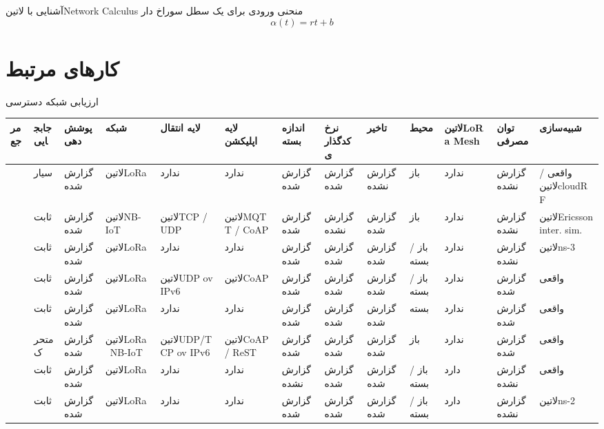 \documentclass[dvipsnames]{beamer}
\begin{document}
\begin{persian}
	\begin{frame}{آشنایی با ‌لاتین{Network Calculus}}
			 منحنی ورودی برای یک سطل سوراخ دار
			\[ \alpha(t) = rt + b \]
	\end{frame}

	\section{کارهای مرتبط}

	\begin{frame}{ارزیابی شبکه دسترسی}
		\fontsize{5pt}{6pt}\selectfont
		\begin{tabularx}{\textwidth}{|*{13}{X|}}
			\toprule
			مرجع &
			جابجایی &
			پوشش‌دهی &
			شبکه &
			لایه انتقال &
			لایه اپلیکشن &
			اندازه بسته &
			نرخ کدگذاری &
			تاخیر &
			محیط &
			‌لاتین{LoRa Mesh} &
			توان مصرفی &
			شبیه‌سازی \\
			\midrule
			\cite{sensors-18-00772-v3} &
			سیار &
			گزارش شده &
			‌لاتین{LoRa} &
			ندارد &
			ندارد &
			گزارش شده &
			گزارش شده &
			گزارش نشده &
			باز &
			ندارد &
			گزارش نشده &
			واقعی / ‌لاتین{cloudRF} \\
			\midrule
			\cite{sensors-19-00007} &
			ثابت &
			گزارش شده &
			‌لاتین{NB-IoT} &
			‌لاتین{TCP / UDP} &
			‌لاتین{MQTT / CoAP} &
			گزارش شده &
			گزارش نشده &
			گزارش شده &
			باز &
			ندارد &
			گزارش نشده &
			‌لاتین{Ericsson inter. sim.} \\
			\midrule
			\cite{sensors-20-03061-v2} &
			ثابت &
			گزارش شده &
			‌لاتین{LoRa} &
			ندارد &
			ندارد &
			گزارش شده &
			گزارش شده &
			گزارش شده &
			باز / بسته &
			ندارد &
			گزارش نشده &
			‌لاتین{ns-3} \\
			\midrule
			\cite{sensors-20-00280-v2} &
			ثابت &
			گزارش شده &
			‌لاتین{LoRa} &
			‌لاتین{UDP ov IPv6} &
			‌لاتین{CoAP} &
			گزارش شده &
			گزارش شده &
			گزارش شده &
			باز / بسته &
			ندارد &
			گزارش شده &
			واقعی \\
			\midrule
			\cite{sensors-20-06721} &
			ثابت &
			گزارش شده &
			‌لاتین{LoRa} &
			ندارد &
			ندارد &
			گزارش شده &
			گزارش شده &
			گزارش شده &
			بسته &
			ندارد &
			گزارش شده &
			واقعی \\
			\midrule
			\cite{SanchezIborra2020} &
			متحرک &
			گزارش شده &
			‌لاتین{LoRa \ NB-IoT} &
			‌لاتین{UDP/TCP ov IPv6} &
			‌لاتین{CoAP / ReST} &
			گزارش شده &
			گزارش شده &
			گزارش شده &
			باز &
			ندارد &
			گزارش شده &
			واقعی \\
			\midrule
			\cite{Lee2018} &
			ثابت &
			گزارش شده &
			‌لاتین{LoRa} &
			ندارد &
			ندارد &
			گزارش نشده &
			گزارش شده &
			گزارش شده &
			باز / بسته &
			دارد &
			گزارش نشده &
			واقعی \\
			\midrule
			\cite{Marahatta2021} &
			ثابت &
			گزارش شده &
			‌لاتین{LoRa} &
			ندارد &
			ندارد &
			گزارش شده &
			گزارش شده &
			گزارش شده &
			باز / بسته &
			دارد &
			گزارش نشده &
			‌لاتین{ns-2} \\
			\bottomrule
		\end{tabularx}
	\end{frame}


\end{persian}
\end{document}
